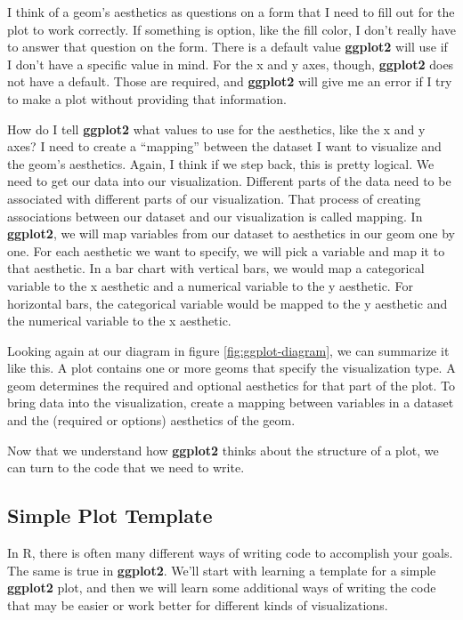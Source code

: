 \documentclass[
]{krantz}
\begin{document}
I think of a geom's aesthetics as questions on a form that I need to fill out for the
plot to work correctly. If something is option, like the fill color, I don't really
have to answer that question on the form. There is a default value \textbf{ggplot2} will
use if I don't have a specific value in mind. For the x and y axes, though, \textbf{ggplot2}
does not have a default. Those are required, and \textbf{ggplot2} will give me an error
if I try to make a plot without providing that information.

How do I tell \textbf{ggplot2} what values to use for the aesthetics, like the x and y
axes? I need to create a ``mapping'' between the dataset I want to visualize and the
geom's aesthetics. Again, I think if we step back, this is pretty logical. We need
to get our data into our visualization. Different parts of the data need to be
associated with different parts of our visualization. That process of creating
associations between our dataset and our visualization is called mapping. In \textbf{ggplot2},
we will map variables from our dataset to aesthetics in our geom one by one. For
each aesthetic we want to specify, we will pick a variable and map it to that
aesthetic. In a bar chart with vertical bars, we would map a categorical variable
to the x aesthetic and a numerical variable to the y aesthetic. For horizontal bars,
the categorical variable would be mapped to the y aesthetic and the numerical
variable to the x aesthetic.

Looking again at our diagram in figure \ref{fig:ggplot-diagram}, we can summarize
it like this. A plot contains one or more geoms that specify the visualization type.
A geom determines the required and optional aesthetics for that part of the plot.
To bring data into the visualization, create a mapping between variables in a dataset
and the (required or options) aesthetics of the geom.

Now that we understand how \textbf{ggplot2} thinks about the structure of a plot, we can
turn to the code that we need to write.

\hypertarget{simple-plot-template}{%
\subsection{Simple Plot Template}\label{simple-plot-template}}

In R, there is often many different ways of writing code to accomplish your goals.
The same is true in \textbf{ggplot2}. We'll start with learning a template for a simple
\textbf{ggplot2} plot, and then we will learn some additional ways of writing the code
that may be easier or work better for different kinds of visualizations.
\end{document}
